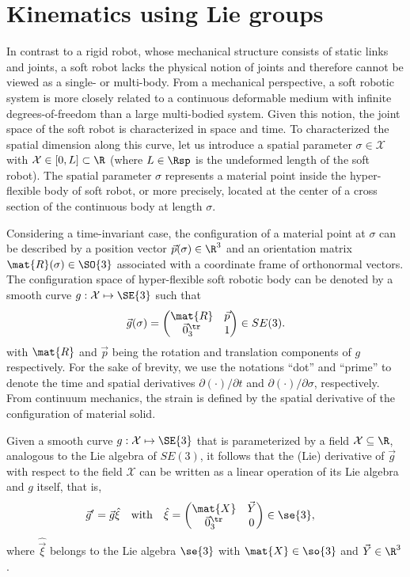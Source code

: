 \section{Kinematics using Lie groups}
In contrast to a rigid robot, whose mechanical structure consists of static links and joints, a soft robot lacks the physical notion of joints and therefore cannot be viewed as a single- or multi-body. From a mechanical perspective, a soft robotic system is more closely related to a continuous deformable medium with infinite degrees-of-freedom than a large multi-bodied system. Given this notion, the joint space of the soft robot is characterized in space and time. To characterized the spatial dimension along this curve, let us introduce a spatial parameter $\sigma \in \mathcal{X}$ with $\mathcal{X} \in [0,L] \subset \R$ (where $L \in \Rsp$ is the undeformed length of the soft robot). The spatial parameter $\sigma$ represents a material point inside the hyper-flexible body of soft robot, or more precisely, located at the center of a cross section of the continuous body at length $\sigma$. 

Considering a time-invariant case, the configuration of a material point at $\sigma$ can be described by a position vector $\vec{p}(\sigma) \in \R^3$ and an orientation matrix $\mat{R}(\sigma) \in \SO{3}$ associated with a coordinate frame of orthonormal vectors. The configuration space of hyper-flexible soft robotic body can be denoted by a smooth curve $g:\mathcal{X} \mapsto \SE{3}$ such that
\begin{equation}
\vec{g}(\sigma) = \begin{pmatrix} \mat{R} & \vec{p} \\ \vec{0}_3^\tr & 1 \end{pmatrix} \in SE(3). 
\end{equation}
with $\mat{R}$ and $\vec{p}$ being the rotation and translation components of $g$ respectively. For the sake of brevity, we use the notations ``dot'' and ``prime'' to denote the time and spatial derivatives $\partial(\cdot)/\partial t$ and $\partial(\cdot)/\partial \sigma$, respectively. From continuum mechanics, the strain is defined by the spatial derivative of the configuration of material solid.

\begin{lemma}
\label{lemma:g_deriv}
Given a smooth curve $g: \mathcal{X} \mapsto \SE{3}$ that is parameterized by a field $\mathcal{X} \subseteq \R$, analogous to the Lie algebra of $SE(3)$, it follows that the (Lie) derivative of $\vec{g}$ with respect to the field $\mathcal{X}$ can be written as a linear operation of its Lie algebra and $g$ itself, that is,
\begin{align}
\vec{g}' & = \vec{g}\hat{\xi} \quad \text{with} \quad \hat{\xi} = \begin{pmatrix} \mat{X} & \vec{Y} \\ \vec{0}_3^\tr & 0 \end{pmatrix} \in \se{3},  \label{eq:gprime}
\end{align}
where $\hat{\vec{\xi}}$ belongs to the Lie algebra $\se{3}$ with $\mat{X} \in \so{3}$ and $\vec{Y} \in \R^3$. 
\end{lemma}

